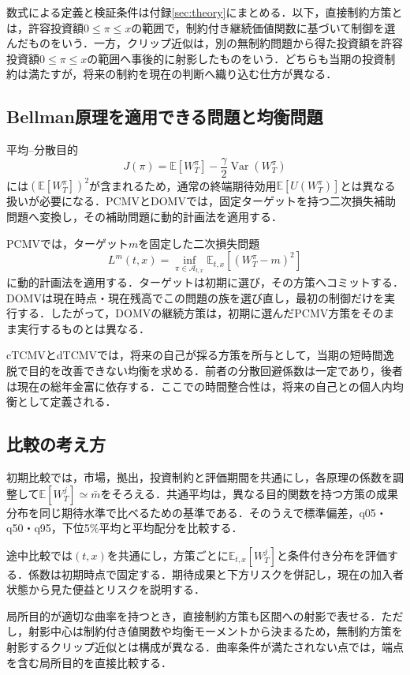 \documentclass[10pt,a4paper]{article}
\theoremstyle{plain}
\theoremstyle{definition}
\newcommand{\E}{\mathbb{E}}
\DeclareMathOperator{\Var}{Var}
\begin{document}
数式による定義と検証条件は付録\ref{sec:theory}にまとめる．以下，直接制約方策とは，許容投資額$0\leq\pi\leq x$の範囲で，制約付き継続価値関数に基づいて制御を選んだものをいう．一方，クリップ近似は，別の無制約問題から得た投資額を許容投資額$0\leq\pi\leq x$の範囲へ事後的に射影したものをいう．どちらも当期の投資制約は満たすが，将来の制約を現在の判断へ織り込む仕方が異なる．

\subsection{Bellman原理を適用できる問題と均衡問題}
平均--分散目的
\[
J(\pi)=\E[W_T^{\pi}]-\frac{\gamma}{2}\Var(W_T^{\pi})
\]
には$(\E[W_T^{\pi}])^2$が含まれるため，通常の終端期待効用$\E[U(W_T^{\pi})]$とは異なる扱いが必要になる．PCMVとDOMVでは，固定ターゲットを持つ二次損失補助問題へ変換し，その補助問題に動的計画法を適用する．

PCMVでは，ターゲット$m$を固定した二次損失問題
\[
L^m(t,x)=\inf_{\pi\in\mathcal A_{t,x}}\E_{t,x}[(W_T^{\pi}-m)^2]
\]
に動的計画法を適用する．ターゲットは初期に選び，その方策へコミットする．DOMVは現在時点・現在残高でこの問題の族を選び直し，最初の制御だけを実行する．したがって，DOMVの継続方策は，初期に選んだPCMV方策をそのまま実行するものとは異なる．

cTCMVとdTCMVでは，将来の自己が採る方策を所与として，当期の短時間逸脱で目的を改善できない均衡を求める．前者の分散回避係数は一定であり，後者は現在の総年金富に依存する．ここでの時間整合性は，将来の自己との個人内均衡として定義される．

\subsection{比較の考え方}
初期比較では，市場，拠出，投資制約と評価期間を共通にし，各原理の係数を調整して$\E[W_T^j]\simeq\bar m$をそろえる．共通平均は，異なる目的関数を持つ方策の成果分布を同じ期待水準で比べるための基準である．そのうえで標準偏差，q05・q50・q95，下位5\%平均と平均配分を比較する．

途中比較では$(t,x)$を共通にし，方策ごとに$\E_{t,x}[W_T^j]$と条件付き分布を評価する．係数は初期時点で固定する．期待成果と下方リスクを併記し，現在の加入者状態から見た便益とリスクを説明する．

局所目的が適切な曲率を持つとき，直接制約方策も区間への射影で表せる．ただし，射影中心は制約付き値関数や均衡モーメントから決まるため，無制約方策を射影するクリップ近似とは構成が異なる．曲率条件が満たされない点では，端点を含む局所目的を直接比較する．
\end{document}
